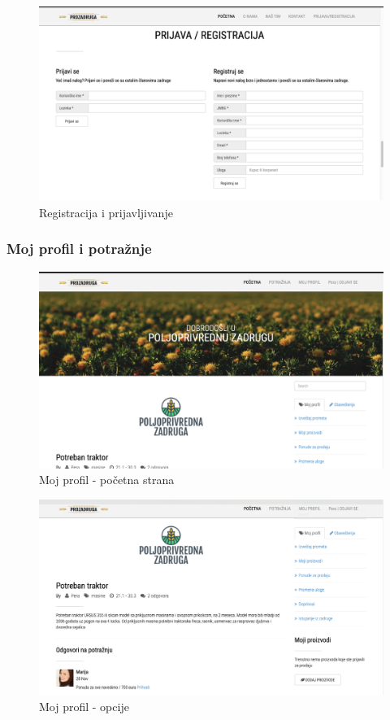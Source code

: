 \documentclass[a4paper]{article}
\begin{document}
\begin{figure}[h!]
    \centering
    \includegraphics[scale=0.3]{images/register.png}
    \caption{Registracija i prijavljivanje}
    \label{register}
\end{figure}


\newpage
\subsubsection{Moj profil i potražnje}
\begin{figure}[h!]
    \centering
    \includegraphics[scale=0.3]{images/profile1.png}
    \caption{Moj profil - početna strana}
    \label{profile1}
\end{figure}

\begin{figure}[h!]
    \centering
    \includegraphics[scale=0.3]{images/profile2.png}
    \caption{Moj profil - opcije}
    \label{profile2}
\end{figure}
\end{document}
